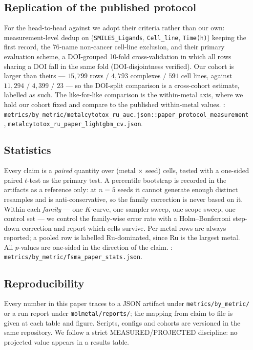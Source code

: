 \subsection{Replication of the published protocol}
\label{sec:method:krasnov}

For the head-to-head against \citet{krasnov2026metalcytotoxdb} we adopt their
criteria rather than our own: measurement-level dedup on
(\texttt{SMILES\_Ligands}, \texttt{Cell\_line}, \texttt{Time(h)}) keeping the
first record, the 76-name non-cancer cell-line exclusion, and their primary
evaluation scheme, a DOI-grouped 10-fold cross-validation in which all rows
sharing a DOI fall in the same fold (DOI-disjointness verified). Our cohort is
larger than theirs --- $15{,}799$ rows / $4{,}793$ complexes / $591$ cell lines,
against $11{,}294$ / $4{,}399$ / $23$ --- so the DOI-split comparison is a
cross-cohort estimate, labelled as such. The like-for-like comparison is the
within-metal axis, where we hold our cohort fixed and compare to the published
within-metal values. \MEASURED:
\texttt{metrics/by\_metric/metalcytotox\_ru\_auc.json::paper\_protocol\_measurement},
\texttt{metalcytotox\_ru\_paper\_lightgbm\_cv.json}.

\subsection{Statistics}
\label{sec:method:stats}

Every claim is a \emph{paired} quantity over (metal $\times$ seed) cells, tested
with a one-sided paired $t$-test as the primary test. A percentile bootstrap is
recorded in the artifacts as a reference only: at $n=5$ seeds it cannot generate
enough distinct resamples and is anti-conservative, so the family correction is
never based on it. Within each \emph{family} --- one $K$-curve, one sampler
sweep, one scope sweep, one control set --- we control the family-wise error
rate with a Holm--Bonferroni step-down correction \citep{holm1979} and report
which cells survive. Per-metal rows are always reported; a pooled row is labelled
Ru-dominated, since Ru is the largest metal. All $p$-values are one-sided in the
direction of the claim. \MEASURED:
\texttt{metrics/by\_metric/fsma\_paper\_stats.json}.

\subsection{Reproducibility}
\label{sec:method:repro}

Every number in this paper traces to a JSON artifact under
\texttt{metrics/by\_metric/} or a run report under \texttt{molmetal/reports/};
the mapping from claim to file is given at each table and figure. Scripts,
configs and cohorts are versioned in the same repository. We follow a strict
MEASURED/PROJECTED discipline: no projected value appears in a results table.

